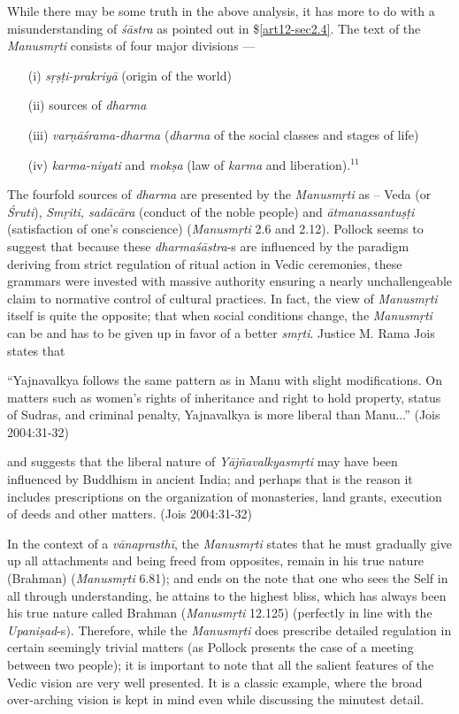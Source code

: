 While there may be some truth in the above analysis, it has more to do with a misunderstanding of {\sl śāstra} as pointed out in \$\ref{art12-sec2.4}. The text of the {\sl Manusmṛti} consists of four major divisions ---
\begin{itemize}
\item[(i)] {\sl sṛṣṭi-prakriyā} (origin of the world)

\item[(ii)] sources of {\sl dharma}

\item[(iii)] {\sl varṇāśrama-dharma} ({\sl dharma} of the social classes and stages of life)

\item[(iv)] {\sl karma-niyati} and {\sl mokṣa} (law of {\sl karma} and liberation).$^{11}$
\end{itemize}

The fourfold sources of {\sl dharma} are presented by the {\sl Manusmṛti} as -- Veda (or {\sl Śruti}), {\sl Smṛiti, sadācāra} (conduct of the noble people) and {\sl ātmanassantuṣṭi} (satisfaction of one's conscience) ({\sl Manusmṛti} 2.6 and 2.12). Pollock seems to suggest that because these {\sl dharmaśāstra}-s are influenced by the paradigm deriving from strict regulation of ritual action in Vedic ceremonies, these grammars were invested with massive authority ensuring a nearly unchallengeable claim to normative control of cultural practices. In fact, the view of {\sl Manusmṛti} itself is quite the opposite; that when social conditions change, the {\sl Manusmṛti} can be and has to be given up in favor of a better {\sl smṛti}. Justice M. Rama Jois states that
\begin{myquote}
``Yajnavalkya follows the same pattern as in Manu with slight modifications. On matters such as women's rights of inheritance and right to hold property, status of Sudras, and criminal penalty, Yajnavalkya is more liberal than Manu...'' (Jois 2004:31-32)
\end{myquote}
and suggests that the liberal nature of {\sl Yājñavalkyasmṛti} may have been influenced by Buddhism in ancient India; and perhaps that is the reason it includes prescriptions on the organization of monasteries, land grants, execution of deeds and other matters. (Jois 2004:31-32)

In the context of a {\sl vānaprasthī}, the {\sl Manusmṛti} states that he must gradually give up all attachments and being freed from opposites, remain in his true nature (Brahman) ({\sl Manusmṛti} 6.81); and ends on the note that one who sees the Self in all through understanding, he attains to the highest bliss, which has always been his true nature called Brahman ({\sl Manusmṛti} 12.125) (perfectly in line with the {\sl Upaniṣad}-s). Therefore, while the {\sl Manusmṛti} does prescribe detailed regulation in certain seemingly trivial matters (as Pollock presents the case of a meeting between two people); it is important to note that all the salient features of the Vedic vision are very well presented. It is a classic example, where the broad over-arching vision is kept in mind even while discussing the minutest detail.

